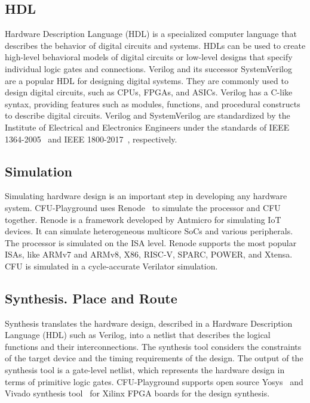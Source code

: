 \subsection{HDL}

Hardware Description Language (HDL) is a specialized computer language that describes the behavior of digital circuits and systems. HDLs can be used to create high-level behavioral models of digital circuits or low-level designs that specify individual logic gates and connections. Verilog and its successor SystemVerilog are a popular HDL for designing digital systems. They are commonly used to design digital circuits, such as CPUs, FPGAs, and ASICs. Verilog has a C-like syntax, providing features such as modules, functions, and procedural constructs to describe digital circuits. Verilog and SystemVerilog are standardized by the Institute of Electrical and Electronics Engineers under the standards of IEEE 1364-2005~\cite{verilog_standard} and IEEE 1800-2017~\cite{system_verilog_standard}, respectively.

\subsection{Simulation}

Simulating hardware design is an important step in developing any hardware system. CFU-Playground uses Renode~\cite{renode} to simulate the processor and CFU together. Renode is a framework developed by Antmicro for simulating IoT devices. It can simulate heterogeneous multicore SoCs and various peripherals. The processor is simulated on the ISA level. Renode supports the most popular ISAs, like ARMv7 and ARMv8, X86, RISC-V, SPARC, POWER, and Xtensa. CFU is simulated in a cycle-accurate Verilator simulation. 

\subsection{Synthesis. Place and Route}

Synthesis translates the hardware design, described in a Hardware Description Language (HDL) such as Verilog, into a netlist that describes the logical functions and their interconnections. The synthesis tool considers the constraints of the target device and the timing requirements of the design. The output of the synthesis tool is a gate-level netlist, which represents the hardware design in terms of primitive logic gates. CFU-Playground supports open source Yosys~\cite{yosys} and Vivado synthesis tool~\cite{vivado_synthesis} for Xilinx FPGA boards for the design synthesis. 

